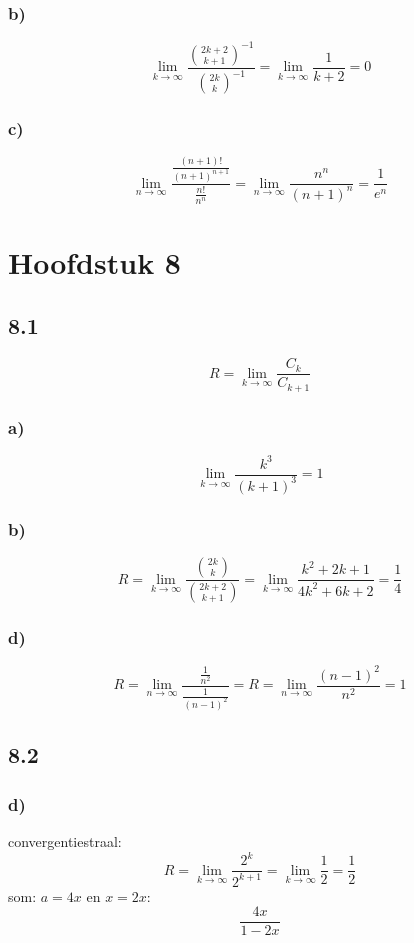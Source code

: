 \documentclass[11pt]{article}
\begin{document}
\subsubsection*{b)}
\[
\lim_{k\rightarrow\infty}\frac{\binom{2k+2}{k+1}^{-1}}{\binom{2k}{k}^{-1}}
=
\lim_{k\rightarrow\infty}\frac{1}{k+2} = 0
\]

\subsubsection*{c)}
\[
\lim_{n\rightarrow\infty}\frac{\frac{(n+1)!}{(n+1)^{n+1}}}{\frac{n!}{n^n}}
=
\lim_{n\rightarrow\infty}\frac{n^n}{(n+1)^n} = \frac{1}{e^n}
\]

\section*{Hoofdstuk 8}
\subsection*{8.1}
\[
R = \lim_{k\rightarrow\infty}\frac{C_k}{C_{k+1}}
\]

\subsubsection*{a)}
\[
\lim_{k\rightarrow\infty}\frac{k^3}{(k+1)^3} = 1
\]

\subsubsection*{b)}
\[
R=\lim_{k\rightarrow\infty}\frac{\binom{2k}{k}}{\binom{2k+2}{k+1}}
=
\lim_{k\rightarrow\infty}\frac{k^2+2k+1}{4k^2+6k+2}
=
\frac{1}{4} 
\]

\subsubsection*{d)}
\[
R=\lim_{n\rightarrow\infty}\frac{\frac{1}{n^2}}{\frac{1}{(n-1)^2}}
=
R=\lim_{n\rightarrow\infty}\frac{(n-1)^2}{n^2}
=
1
\]

\subsection*{8.2}
\subsubsection*{d)}
convergentiestraal:
\[
R=\lim_{k\rightarrow\infty}\frac{2^k}{2^{k+1}}
=
\lim_{k\rightarrow\infty}\frac{1}{2}
=
\frac{1}{2}
\]
som: $a=4x$ en $x=2x$:
\[
\frac{4x}{1-2x}
\]
\end{document}
